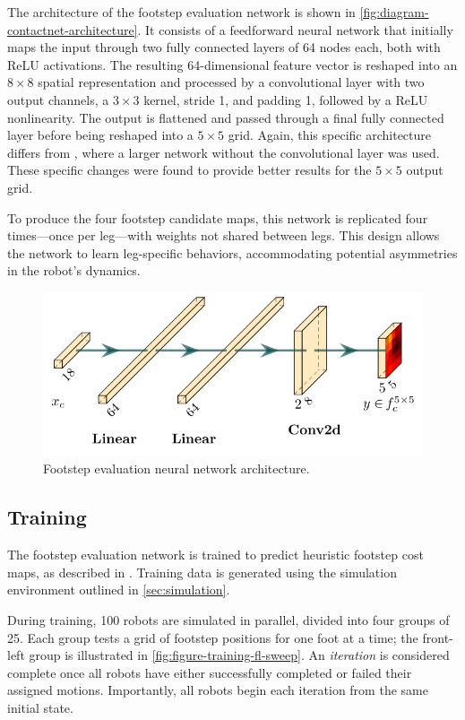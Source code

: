 The architecture of the footstep evaluation network is shown in
\autoref{fig:diagram-contactnet-architecture}. It consists of a
feedforward neural network that initially maps the input through two
fully connected layers of 64 nodes each, both with ReLU activations.
The resulting 64-dimensional feature vector is reshaped into an $8
\times 8$ spatial representation and processed by a convolutional
layer with two output channels, a $3 \times 3$ kernel, stride 1, and
padding 1, followed by a ReLU nonlinearity. The output is flattened
and passed through a final fully connected layer before being
reshaped into a $5 \times 5$ grid. Again, this specific architecture
differs from \cite{bratta_contactnet_2024}, where a larger network
without the convolutional layer was used. These specific changes were
found to provide better results for the $5 \times 5$ output grid.

To produce the four footstep candidate maps, this network is
replicated four times—once per leg—with weights not shared between
legs. This design allows the network to learn leg-specific behaviors,
accommodating potential asymmetries in the robot’s dynamics.

\begin{figure}[H]
  \centering
  \includegraphics[width=0.5\linewidth]{images/diagrams/contact-network-architecture.png}
  \caption{Footstep evaluation neural network architecture.}
  \label{fig:diagram-contactnet-architecture}
\end{figure}

\subsection{Training}

The footstep evaluation network is trained to predict heuristic
footstep cost maps, as described in \cite{bratta_contactnet_2024}.
Training data is generated using the simulation environment outlined
in \autoref{sec:simulation}.

During training, 100 robots are simulated in parallel, divided into
four groups of 25. Each group tests a grid of footstep positions for
one foot at a time; the front-left group is illustrated in
\autoref{fig:figure-training-fl-sweep}. An \textit{iteration} is
considered complete once all robots have either successfully
completed or failed their assigned motions. Importantly, all robots
begin each iteration from the same initial state.

